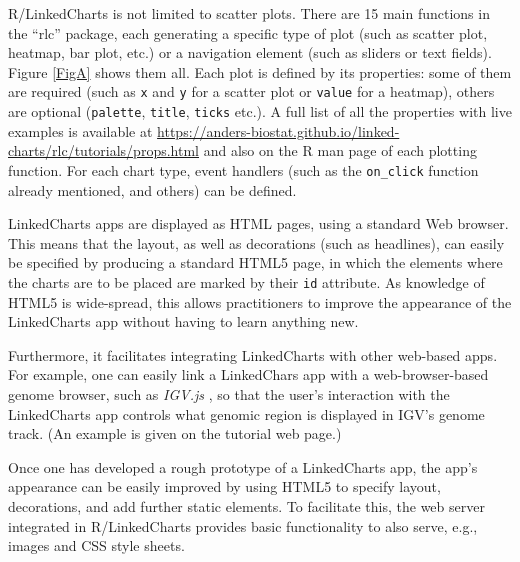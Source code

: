 \documentclass[twocolumn,10pt]{article}
\begin{document}
R/LinkedCharts is not limited to scatter plots. There are 15 main functions in the ``rlc'' package, each generating a specific type of plot (such as scatter plot, heatmap, bar plot, etc.) or a navigation element (such as sliders or text fields). Figure \ref{FigA} shows them all. Each plot is defined by its properties: some of them are required (such as \texttt{x} and \texttt{y} for a scatter plot or \texttt{value} for a heatmap), others are optional (\texttt{palette}, \texttt{title}, \texttt{ticks} etc.). A full list of all the properties with live examples is available at \url{https://anders-biostat.github.io/linked-charts/rlc/tutorials/props.html} and also on the R man page of each plotting function. For each chart type, event handlers (such as the \texttt{on_click} function already mentioned, and others) can be defined.

LinkedCharts apps are displayed as HTML pages, using a standard Web browser. This means that the layout, as well as decorations (such as headlines), can easily be specified by producing a standard HTML5 page, in which the elements where the charts are to be placed are marked by their \texttt{id} attribute. As knowledge of HTML5 is wide-spread, this allows practitioners to improve the appearance of the LinkedCharts app without having to learn anything new. 

Furthermore, it facilitates integrating LinkedCharts with other web-based apps. For example, one can easily link a LinkedChars app with a web-browser-based genome browser, such as \emph{IGV.js} \cite{robinson_2020}, so that the user's interaction with the LinkedCharts app controls what genomic region is displayed in IGV's genome track. (An example is given on the tutorial web page.)

Once one has developed a rough prototype of a LinkedCharts app, the app's appearance can be easily improved by using HTML5 to specify layout, decorations, and add further static elements. To facilitate this, the web server integrated in R/LinkedCharts provides basic functionality to also serve, e.g., images and CSS style sheets.
\end{document}
